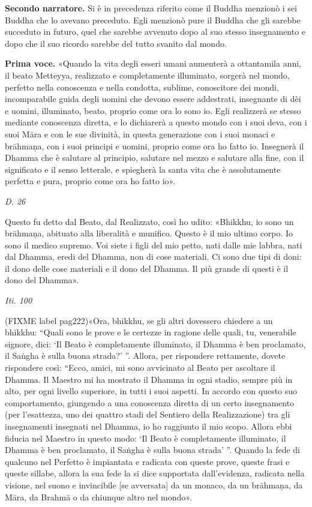 \textbf{Secondo narratore.} Si è in precedenza riferito come il Buddha menzionò i
sei Buddha che lo avevano preceduto. Egli menzionò pure il Buddha che
gli sarebbe succeduto in futuro, quel che sarebbe avvenuto dopo al suo
stesso insegnamento e dopo che il suo ricordo sarebbe del tutto svanito
dal mondo.


\textbf{Prima voce.} «Quando la vita degli esseri umani aumenterà a ottantamila
anni, il beato Metteyya, realizzato e completamente illuminato, sorgerà
nel mondo, perfetto nella conoscenza e nella condotta, sublime,
conoscitore dei mondi, incomparabile guida degli uomini che devono
essere addestrati, insegnante di dèi e uomini, illuminato, beato,
proprio come ora lo sono io. Egli realizzerà se stesso mediante
conoscenza diretta, e lo dichiarerà a questo mondo con i suoi deva, con
i suoi Māra e con le sue divinità, in questa generazione con i suoi
monaci e brāhmaṇa, con i suoi principi e uomini, proprio come ora ho
fatto io. Insegnerà il Dhamma che è salutare al principio, salutare nel
mezzo e salutare alla fine, con il significato e il senso letterale, e
spiegherà la santa vita che è assolutamente perfetta e pura, proprio
come ora ho fatto io».


\emph{D. 26}


Questo fu detto dal Beato, dal Realizzato, così ho udito: «Bhikkhu, io
sono un brāhmaṇa, abituato alla liberalità e munifico. Questo è il mio
ultimo corpo. Io sono il medico supremo. Voi siete i figli del mio
petto, nati dalle mie labbra, nati dal Dhamma, eredi del Dhamma, non di
cose materiali. Ci sono due tipi di doni: il dono delle cose materiali e
il dono del Dhamma. Il più grande di questi è il dono del Dhamma».


\emph{Iti. 100}


(FIXME label pag222)«Ora, bhikkhu, se gli altri dovessero chiedere a un bhikkhu: “Quali sono
le prove e le certezze in ragione delle quali, tu, venerabile signore,
dici: ‘Il Beato è completamente illuminato, il Dhamma è ben proclamato,
il Saṅgha è sulla buona strada?’ ”. Allora, per rispondere rettamente,
dovete rispondere così: “Ecco, amici, mi sono avvicinato al Beato per
ascoltare il Dhamma. Il Maestro mi ha mostrato il Dhamma in ogni stadio,
sempre più in alto, per ogni livello superiore, in tutti i suoi aspetti.
In accordo con questo suo comportamento, giungendo a una conoscenza
diretta di un certo insegnamento (per l’esattezza, uno dei quattro stadi
del Sentiero della Realizzazione) tra gli insegnamenti insegnati nel
Dhamma, io ho raggiunto il mio scopo. Allora ebbi fiducia nel Maestro in
questo modo: ‘Il Beato è completamente illuminato, il Dhamma è ben
proclamato, il Saṅgha è sulla buona strada’ ”. Quando la fede di
qualcuno nel Perfetto è impiantata e radicata con queste prove, queste
frasi e queste sillabe, allora la sua fede la si dice supportata
dall’evidenza, radicata nella visione, nel suono e invincibile [se
avversata] da un monaco, da un brāhmaṇa, da Māra, da Brahmā o da
chiunque altro nel mondo».


